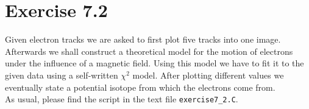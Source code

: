 \documentclass[10pt]{article}
\newenvironment{myfont}{\fontfamily{put}\selectfont}{\par}
\begin{document}
\begin{myfont}
\section*{Exercise 7.2}

Given electron tracks we are asked to first plot five tracks into one image.
Afterwards we shall construct a theoretical model for the motion of electrons under the influence of a magnetic field.
Using this model we have to fit it to the given data using a self-written $\chi^{2}$ model.
After plotting different values we eventually state a potential isotope from which the electrons come from. \\

\noindent As usual, please find the script in the text file \texttt{exercise7\_2.C}.


\end{myfont}
\end{document}
